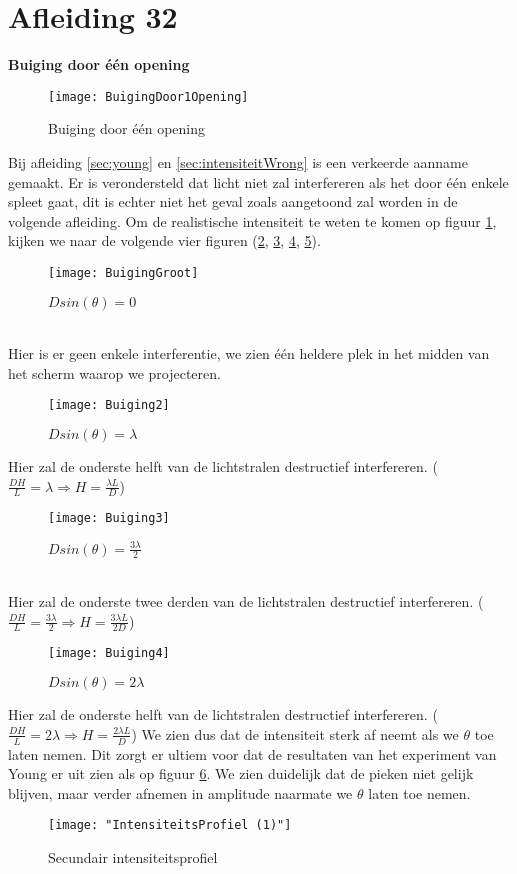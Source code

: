 \documentclass[a4paper,kul]{kulakarticle} %
\begin{document}
\section{Afleiding 32}
\label{sec:RealiteitBuiging}
\textbf{Buiging door één opening}\\
\begin{figure}[!h]
	\centering
	\texttt{[image: BuigingDoor1Opening]}
	\caption[Buiging door 1 opening]{Buiging door één opening}
	\label{fig:buigingdoor1opening}
\end{figure}
Bij afleiding \ref{sec:young} en \ref{sec:intensiteitWrong} is een verkeerde aanname gemaakt. Er is verondersteld dat licht niet zal interfereren als het door één enkele spleet gaat, dit is echter niet het geval zoals aangetoond zal worden in de volgende afleiding. Om de realistische intensiteit te weten te komen op figuur \ref{fig:buigingdoor1opening}, kijken we naar de volgende vier figuren (\ref{fig:buiging1}, \ref{fig:buiging2}, \ref{fig:buiging3}, \ref{fig:buiging4}). 
\begin{figure}[!h]
	\centering
	\texttt{[image: BuigingGroot]}
	\caption[Buiging 1]{$Dsin(\theta)=0$}
	\label{fig:buiging1}
\end{figure}\\
Hier is er geen enkele interferentie, we zien één heldere plek in het midden van het scherm waarop we projecteren.
\newpage
\begin{figure}[!h]
	\centering
	\texttt{[image: Buiging2]}
	\caption[Buiging 2]{$Dsin(\theta)=\lambda$}
	\label{fig:buiging2}
\end{figure}
Hier zal de onderste helft van de lichtstralen destructief interfereren. ($ \frac{DH}{L}=\lambda\Rightarrow H=\frac{\lambda L}{D}$)
\begin{figure}[!h]
	\centering
	\texttt{[image: Buiging3]}
	\caption[Buiging 3]{$Dsin(\theta)=\frac{3\lambda}{2}$}
	\label{fig:buiging3}
\end{figure}\\
Hier zal de onderste twee derden van de lichtstralen destructief interfereren. ($ \frac{DH}{L}=\frac{3\lambda}{2}\Rightarrow H=\frac{3\lambda L}{2D}$)
\newpage
\begin{figure}[!h]
	\centering
	\texttt{[image: Buiging4]}
	\caption[Buiging 4]{$Dsin(\theta)=2\lambda$}
	\label{fig:buiging4}
\end{figure}
Hier zal de onderste helft van de lichtstralen destructief interfereren. ($ \frac{DH}{L}=2\lambda\Rightarrow H=\frac{2\lambda L}{D}$)
\newline
We zien dus dat de intensiteit sterk af neemt als we $\theta$ toe laten nemen. Dit zorgt er ultiem voor dat de resultaten van het experiment van Young er uit zien als op figuur \ref{fig:intensiteitsprofiel-1}. We zien duidelijk dat de pieken niet gelijk blijven, maar verder afnemen in amplitude naarmate we $\theta$ laten toe nemen. 
\begin{figure}[!h]
	\centering
	\texttt{[image: "IntensiteitsProfiel (1)"]}
	\caption[Intensiteitsprofiel]{Secundair intensiteitsprofiel}
	\label{fig:intensiteitsprofiel-1}
\end{figure}
\end{document}
